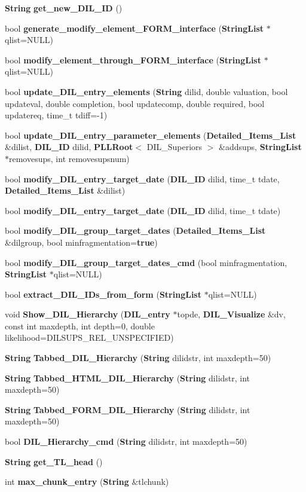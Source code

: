 \begin{CompactItemize}
{\bf String} {\bf get\_\-new\_\-DIL\_\-ID} ()
\item 
bool {\bf generate\_\-modify\_\-element\_\-FORM\_\-interface} ({\bf String\-List} $\ast$qlist=NULL)
\item 
bool {\bf modify\_\-element\_\-through\_\-FORM\_\-interface} ({\bf String\-List} $\ast$qlist=NULL)
\item 
bool {\bf update\_\-DIL\_\-entry\_\-elements} ({\bf String} dilid, double valuation, bool updateval, double completion, bool updatecomp, double required, bool updatereq, time\_\-t tdiff=-1)
\item 
bool {\bf update\_\-DIL\_\-entry\_\-parameter\_\-elements} ({\bf Detailed\_\-Items\_\-List} \&dilist, {\bf DIL\_\-ID} dilid, {\bf PLLRoot}$<$ DIL\_\-Superiors $>$ \&addsups, {\bf String\-List} $\ast$removesups, int removesupsnum)
\item 
bool {\bf modify\_\-DIL\_\-entry\_\-target\_\-date} ({\bf DIL\_\-ID} dilid, time\_\-t tdate, {\bf Detailed\_\-Items\_\-List} \&dilist)
\item 
bool {\bf modify\_\-DIL\_\-entry\_\-target\_\-date} ({\bf DIL\_\-ID} dilid, time\_\-t tdate)
\item 
bool {\bf modify\_\-DIL\_\-group\_\-target\_\-dates} ({\bf Detailed\_\-Items\_\-List} \&dilgroup, bool minfragmentation={\bf true})
\item 
bool {\bf modify\_\-DIL\_\-group\_\-target\_\-dates\_\-cmd} (bool minfragmentation, {\bf String\-List} $\ast$qlist=NULL)
\item 
bool {\bf extract\_\-DIL\_\-IDs\_\-from\_\-form} ({\bf String\-List} $\ast$qlist=NULL)
\item 
void {\bf Show\_\-DIL\_\-Hierarchy} ({\bf DIL\_\-entry} $\ast$topde, {\bf DIL\_\-Visualize} \&dv, const int maxdepth, int depth=0, double likelihood=DILSUPS\_\-REL\_\-UNSPECIFIED)
\item 
{\bf String} {\bf Tabbed\_\-DIL\_\-Hierarchy} ({\bf String} dilidstr, int maxdepth=50)
\item 
{\bf String} {\bf Tabbed\_\-HTML\_\-DIL\_\-Hierarchy} ({\bf String} dilidstr, int maxdepth=50)
\item 
{\bf String} {\bf Tabbed\_\-FORM\_\-DIL\_\-Hierarchy} ({\bf String} dilidstr, int maxdepth=50)
\item 
bool {\bf DIL\_\-Hierarchy\_\-cmd} ({\bf String} dilidstr, int maxdepth=50)
\item 
{\bf String} {\bf get\_\-TL\_\-head} ()
\item 
int {\bf max\_\-chunk\_\-entry} ({\bf String} \&tlchunk)

\end{CompactItemize}
